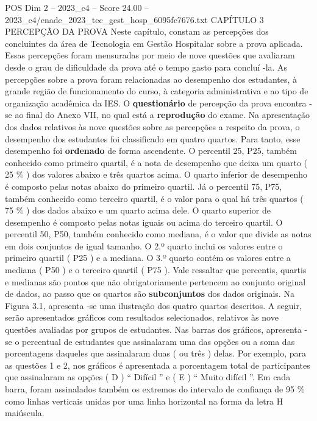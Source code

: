 \begin{textsample}{POS Dim 2 – 2023\_c4 – Score 24.00 – 2023\_c4/enade\_2023\_tec\_gest\_hosp\_6095fc7676.txt}  \label{ex:f2_pos_019}
CAPÍTULO 3 PERCEPÇÃO DA PROVA Neste capítulo, constam as percepções dos concluintes da área de Tecnologia em Gestão Hospitalar sobre a prova aplicada.
Essas percepções foram mensuradas por meio de nove questões que avaliaram desde o grau de dificuldade da prova até o tempo gasto para concluí -la.
As percepções sobre a prova foram relacionadas ao desempenho dos estudantes, à grande região de funcionamento do curso, à categoria administrativa e ao tipo de organização acadêmica da IES.
O \textbf{questionário} de percepção da prova encontra -se ao final do Anexo VII, no qual está a \textbf{reprodução} do exame.
Na apresentação dos dados relativos às nove questões sobre as percepções a respeito da prova, o desempenho dos estudantes foi classificado em quatro quartos.
Para tanto, esse desempenho foi \textbf{ordenado} de forma ascendente.
O percentil 25, P25, também conhecido como primeiro quartil, é a nota de desempenho que deixa um quarto ( 25 \% ) dos valores abaixo e três quartos acima.
O quarto inferior de desempenho é composto pelas notas abaixo do primeiro quartil.
Já o percentil 75, P75, também conhecido como terceiro quartil, é o valor para o qual há três quartos ( 75 \% ) dos dados abaixo e um quarto acima dele.
O quarto superior de desempenho é composto pelas notas iguais ou acima do terceiro quartil.
O percentil 50, P50, também conhecido como mediana, é o valor que divide as notas em dois conjuntos de igual tamanho.
O 2.º quarto inclui os valores entre o primeiro quartil ( P25 ) e a mediana.
O 3.º quarto contém os valores entre a mediana ( P50 ) e o terceiro quartil ( P75 ).
Vale ressaltar que percentis, quartis e medianas são pontos que não obrigatoriamente pertencem ao conjunto original de dados, ao passo que os quartos são \textbf{subconjuntos} dos dados originais.
Na Figura 3.1, apresenta -se uma ilustração dos quatro quartos descritos.
A seguir, serão apresentados gráficos com resultados selecionados, relativos às nove questões avaliadas por grupos de estudantes.
Nas barras dos gráficos, apresenta -se o percentual de estudantes que assinalaram uma das opções ou a soma das porcentagens daqueles que assinalaram duas ( ou três ) delas.
Por exemplo, para as questões 1 e 2, nos gráficos é apresentada a porcentagem total de participantes que assinalaram as opções ( D ) “ Difícil ” e ( E ) “ Muito difícil ”.
Em cada barra, foram assinalados também os extremos do intervalo de confiança de 95 \% como linhas verticais unidas por uma linha horizontal na forma da letra H maiúscula.

\end{textsample}
